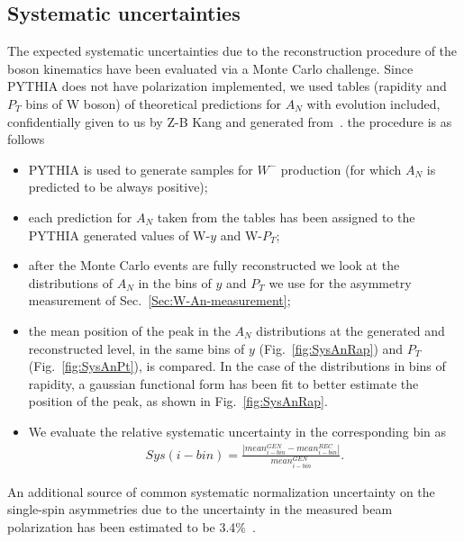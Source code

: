 \documentclass[12pt]{article}
\begin{document}
\subsection{Systematic uncertainties} \label{Sec:Syst}
The expected systematic uncertainties due to the reconstruction procedure of the boson kinematics have been evaluated via a Monte Carlo challenge. %
Since PYTHIA does not have polarization implemented, we used tables (rapidity and $P_{T}$ bins of W boson) of theoretical predictions for $A_{N}$ with evolution included, confidentially given to us by Z-B Kang and generated from~\cite{Kang:2014}. the procedure is as follows

\begin{itemize}
\item PYTHIA is used to generate samples for $W^{-}$ production (for which $A_{N}$ is predicted to be always positive);
\item each prediction for $A_{N}$ taken from the tables has been assigned to the PYTHIA generated values of W-$y$ and W-$P_{T}$;
\item after the Monte Carlo events are fully reconstructed we look at the distributions of $A_{N}$ in the bins of $y$ and $P_{T}$ we use for the asymmetry measurement of Sec.~\ref{Sec:W-An-measurement};
\item the mean position of the peak in the $A_{N}$ distributions at the generated and reconstructed level, in the same bins of $y$ (Fig.~\ref{fig:SysAnRap}) and $P_{T}$ (Fig.~\ref{fig:SysAnPt}), is compared. In the case of the distributions in bins of rapidity, a gaussian functional form has been fit to better estimate the position of the peak, as shown in Fig.~\ref{fig:SysAnRap}.  
\item We evaluate the relative systematic uncertainty in the corresponding bin as
\begin{align}
Sys(i-bin)=\frac{|mean^{GEN}_{i-bin}-mean^{REC}_{i-bin}|}{mean^{GEN}_{i-bin}}.
\end{align}
\end{itemize}

An additional source of common systematic normalization uncertainty on the single-spin
asymmetries due to the uncertainty in the measured beam polarization has been estimated to be 3.4\%~\cite{RHIC-Pol}.
\end{document}
